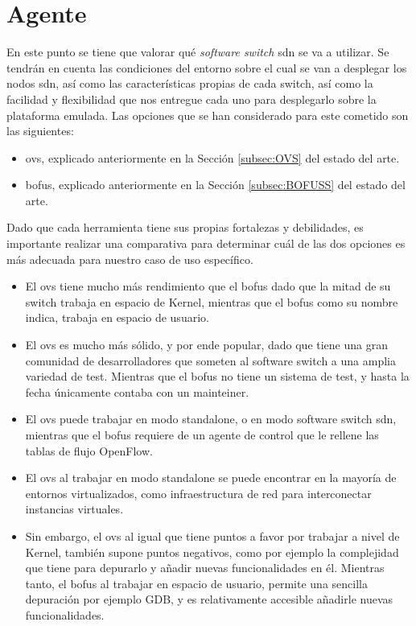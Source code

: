\section{Agente }
\label{sec:ana_switch}

En este punto se tiene que valorar qué \textit{software switch} \gls{sdn} se va a utilizar. Se tendrán en cuenta las condiciones del entorno sobre el cual se van a desplegar los nodos \gls{sdn}, así como las características propias de cada switch, así como la facilidad y flexibilidad que nos entregue cada uno para desplegarlo sobre la plataforma emulada. Las opciones que se han considerado para este cometido son las siguientes:

\begin{itemize}
    \item \gls{ovs}, explicado anteriormente en la Sección \ref{subsec:OVS} del estado del arte.

    \item \gls{bofus}, explicado anteriormente en la Sección \ref{subsec:BOFUSS} del estado del arte.
\end{itemize}

Dado que cada herramienta tiene sus propias fortalezas y debilidades, es importante realizar una comparativa para determinar cuál de las dos opciones es más adecuada para nuestro caso de uso específico.

\begin{itemize}
    \item El \gls{ovs} tiene mucho más rendimiento que el \gls{bofus} dado que la mitad de su switch trabaja en espacio de Kernel, mientras que el \gls{bofus} como su nombre indica, trabaja en espacio de usuario.
    \item El \gls{ovs} es mucho más sólido, y por ende popular, dado que tiene una gran comunidad de desarrolladores que someten al software switch a una amplia variedad de test. Mientras que el \gls{bofus} no tiene un sistema de test, y hasta la fecha únicamente contaba con un mainteiner.
    \item El \gls{ovs} puede trabajar en modo standalone, o en modo software switch \gls{sdn}, mientras que el \gls{bofus} requiere de un agente de control que le rellene las tablas de flujo OpenFlow.
    \item El \gls{ovs} al trabajar en modo standalone se puede encontrar en la mayoría de entornos virtualizados, como infraestructura de red para interconectar instancias virtuales.
    \item Sin embargo, el \gls{ovs} al igual que tiene puntos a favor por trabajar a nivel de Kernel, también supone puntos negativos, como por ejemplo la complejidad que tiene para depurarlo y añadir nuevas funcionalidades en él. Mientras tanto, el \gls{bofus} al trabajar en espacio de usuario, permite una sencilla  depuración por ejemplo GDB, y es relativamente accesible añadirle nuevas funcionalidades.
\end{itemize}

